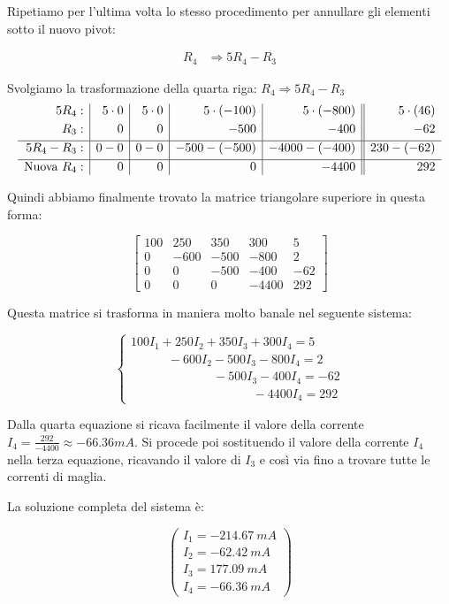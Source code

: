 Ripetiamo per l'ultima volta lo stesso procedimento per annullare gli elementi sotto il nuovo pivot:

\begin{equation}
\begin{aligned}
R_4 &\Rightarrow 5 R_4 - R_3
\end{aligned}
\end{equation}


Svolgiamo la trasformazione della quarta riga: $R_4 \Rightarrow 5R_4 - R_3$
\[
\begin{array}{r | r | r | r | r || r}
5R_4: & 5\cdot0 & 5\cdot0 & 5\cdot(-100) & 5\cdot(-800) & 5\cdot(46) \\[1mm]
R_3: & 0 & 0 & -500 & -400 & -62 \\[1mm]
\hline
5R_4 - R_3: & 0-0 & 0-0 & -500-(-500) & -4000-(-400) & 230-(-62) \\[1mm]
\hline
\text{Nuova }R_4: & 0 & 0 & 0 & -4400 & 292
\end{array}
\]

Quindi abbiamo finalmente trovato la matrice triangolare superiore in questa forma:

\begin{equation}
	\left[
		\begin{array}{cccc|c}
		100 & 250 & 350 & 300 & 5 \\
		0   & -600 & -500 & -800 & 2 \\
		0   & 0 & -500 & -400 & -62 \\
		0   & 0  & 0  & -4400  & 292
		\end{array}
	\right]
\end{equation}

Questa matrice si trasforma in maniera molto banale nel seguente sistema:

\begin{equation}
    \begin{cases}
	100I_1+250I_2+350I_3+300I_4 = 5\\
	\quad\qquad-600I_2-500I_3-800I_4 = 2\\
	\,\,\,\,\qquad\qquad\qquad-500I_3-400I_4=-62\\
	\qquad\qquad\qquad\qquad\quad\,\,\,\,\,-4400I_4=292
    \end{cases}
	\label{eq: sistema ridotto a gradini}
\end{equation}

Dalla quarta equazione si ricava facilmente il valore della corrente $I_4 = \frac{292}{-4400} \approx -66.36mA.$ Si procede poi sostituendo il valore della corrente $I_4$ nella terza equazione, ricavando il valore di $I_3$ e così via fino a trovare tutte le correnti di maglia.

La soluzione completa del sistema è:

\begin{equation}
\left(\begin{matrix}
I_1 = \SI{-214,67}{mA} \\
I_2 = \SI{-62,42}{mA} \\
I_3 = \SI{177,09}{mA}\\
I_4 = \SI{-66,36}{mA}
\end{matrix}\right)
\end{equation}